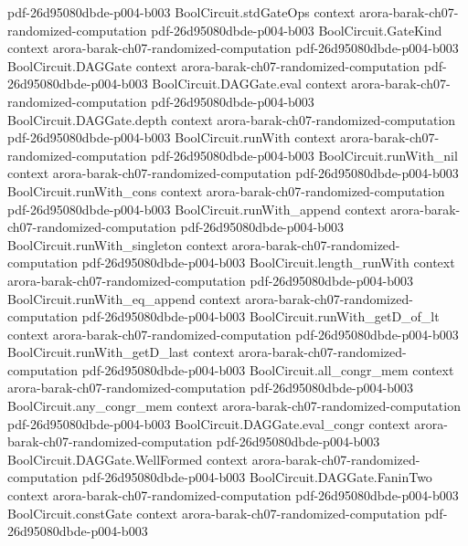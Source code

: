 \begin{theorem}
  {pdf-26d95080dbde-p004-b003}
\proofstep
  {BoolCircuit.stdGateOps}
  {context}
  {arora-barak-ch07-randomized-computation}
  {pdf-26d95080dbde-p004-b003}
\proofstep
  {BoolCircuit.GateKind}
  {context}
  {arora-barak-ch07-randomized-computation}
  {pdf-26d95080dbde-p004-b003}
\proofstep
  {BoolCircuit.DAGGate}
  {context}
  {arora-barak-ch07-randomized-computation}
  {pdf-26d95080dbde-p004-b003}
\proofstep
  {BoolCircuit.DAGGate.eval}
  {context}
  {arora-barak-ch07-randomized-computation}
  {pdf-26d95080dbde-p004-b003}
\proofstep
  {BoolCircuit.DAGGate.depth}
  {context}
  {arora-barak-ch07-randomized-computation}
  {pdf-26d95080dbde-p004-b003}
\proofstep
  {BoolCircuit.runWith}
  {context}
  {arora-barak-ch07-randomized-computation}
  {pdf-26d95080dbde-p004-b003}
\proofstep
  {BoolCircuit.runWith_nil}
  {context}
  {arora-barak-ch07-randomized-computation}
  {pdf-26d95080dbde-p004-b003}
\proofstep
  {BoolCircuit.runWith_cons}
  {context}
  {arora-barak-ch07-randomized-computation}
  {pdf-26d95080dbde-p004-b003}
\proofstep
  {BoolCircuit.runWith_append}
  {context}
  {arora-barak-ch07-randomized-computation}
  {pdf-26d95080dbde-p004-b003}
\proofstep
  {BoolCircuit.runWith_singleton}
  {context}
  {arora-barak-ch07-randomized-computation}
  {pdf-26d95080dbde-p004-b003}
\proofstep
  {BoolCircuit.length_runWith}
  {context}
  {arora-barak-ch07-randomized-computation}
  {pdf-26d95080dbde-p004-b003}
\proofstep
  {BoolCircuit.runWith_eq_append}
  {context}
  {arora-barak-ch07-randomized-computation}
  {pdf-26d95080dbde-p004-b003}
\proofstep
  {BoolCircuit.runWith_getD_of_lt}
  {context}
  {arora-barak-ch07-randomized-computation}
  {pdf-26d95080dbde-p004-b003}
\proofstep
  {BoolCircuit.runWith_getD_last}
  {context}
  {arora-barak-ch07-randomized-computation}
  {pdf-26d95080dbde-p004-b003}
\proofstep
  {BoolCircuit.all_congr_mem}
  {context}
  {arora-barak-ch07-randomized-computation}
  {pdf-26d95080dbde-p004-b003}
\proofstep
  {BoolCircuit.any_congr_mem}
  {context}
  {arora-barak-ch07-randomized-computation}
  {pdf-26d95080dbde-p004-b003}
\proofstep
  {BoolCircuit.DAGGate.eval_congr}
  {context}
  {arora-barak-ch07-randomized-computation}
  {pdf-26d95080dbde-p004-b003}
\proofstep
  {BoolCircuit.DAGGate.WellFormed}
  {context}
  {arora-barak-ch07-randomized-computation}
  {pdf-26d95080dbde-p004-b003}
\proofstep
  {BoolCircuit.DAGGate.FaninTwo}
  {context}
  {arora-barak-ch07-randomized-computation}
  {pdf-26d95080dbde-p004-b003}
\proofstep
  {BoolCircuit.constGate}
  {context}
  {arora-barak-ch07-randomized-computation}
  {pdf-26d95080dbde-p004-b003}
\proofstep

\end{theorem}
